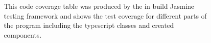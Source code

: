 \documentclass{l4proj}
\begin{document}
\begin{appendices}
\begin{figure}[h]
    \caption{This code coverage table was produced by the in build Jasmine testing framework and shows the test coverage for different parts of the program including the typescript classes and created components.}
    
    \label{fig:codeCoverage}
\end{figure}
\newpage
\end{appendices}






\end{document}
